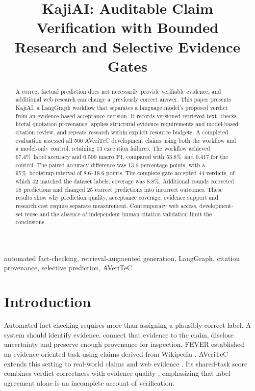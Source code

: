 \documentclass[conference]{IEEEtran}
\newcommand{\pct}{\%}
\begin{document}
\title{KajiAI: Auditable Claim Verification with Bounded Research and Selective Evidence Gates}

\author{
}
\maketitle

\begin{abstract}
A correct factual prediction does not necessarily provide verifiable evidence, and additional web research can change a previously correct answer. This paper presents KajiAI, a LangGraph workflow that separates a language model's proposed verdict from an evidence-based acceptance decision. It records versioned retrieved text, checks literal quotation provenance, applies structural evidence requirements and model-based citation review, and repeats research within explicit resource budgets. A completed evaluation assessed all 500 AVeriTeC development claims using both the workflow and a model-only control, retaining 13 execution failures. The workflow achieved 67.4\pct\ label accuracy and 0.500 macro F1, compared with 53.8\pct\ and 0.417 for the control. The paired accuracy difference was 13.6 percentage points, with a 95\pct\ bootstrap interval of 8.6--18.6 points. The complete gate accepted 44 verdicts, of which 42 matched the dataset labels; coverage was 8.8\pct. Additional rounds corrected 18 predictions and changed 25 correct predictions into incorrect outcomes. These results show why prediction quality, acceptance coverage, evidence support and research cost require separate measurement. Contemporary web access, development-set reuse and the absence of independent human citation validation limit the conclusions.
\end{abstract}

\begin{IEEEkeywords}
automated fact-checking, retrieval-augmented generation, LangGraph, citation provenance, selective prediction, AVeriTeC
\end{IEEEkeywords}

\section{Introduction}
Automated fact-checking requires more than assigning a plausibly correct label. A system should identify evidence, connect that evidence to the claim, disclose uncertainty and preserve enough provenance for inspection. FEVER established an evidence-oriented task using claims derived from Wikipedia \cite{fever}. AVeriTeC extends this setting to real-world claims and web evidence \cite{averitec}. Its shared-task score combines verdict correctness with evidence quality \cite{sharedtask}, emphasizing that label agreement alone is an incomplete account of verification.
\end{document}
